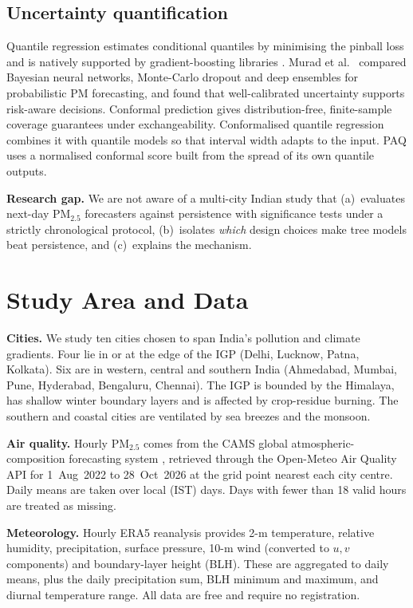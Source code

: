 \documentclass[conference]{IEEEtran}
\begin{document}
\subsection{Uncertainty quantification}
Quantile regression \cite{koenker1978} estimates conditional quantiles by minimising
the pinball loss and is natively supported by gradient-boosting libraries
\cite{chen2016}. Murad et al.\ \cite{murad2021} compared Bayesian neural networks,
Monte-Carlo dropout and deep ensembles for probabilistic PM forecasting, and found that
well-calibrated uncertainty supports risk-aware decisions. Conformal prediction
\cite{lei2018} gives distribution-free, finite-sample coverage guarantees under
exchangeability. Conformalised quantile regression \cite{romano2019} combines it with
quantile models so that interval width adapts to the input. PAQ uses a normalised
conformal score built from the spread of its own quantile outputs.

\textbf{Research gap.} We are not aware of a multi-city Indian study that (a)~evaluates
next-day PM$_{2.5}$ forecasters against persistence with significance tests under a
strictly chronological protocol, (b)~isolates \emph{which} design choices make tree
models beat persistence, and (c)~explains the mechanism.

\section{Study Area and Data}\label{sec:data}
\textbf{Cities.} We study ten cities chosen to span India's pollution and climate
gradients. Four lie in or at the edge of the IGP (Delhi, Lucknow, Patna, Kolkata).
Six are in western, central and southern India (Ahmedabad, Mumbai, Pune, Hyderabad,
Bengaluru, Chennai). The IGP is bounded by the Himalaya, has shallow winter boundary layers
and is affected by crop-residue burning. The southern and coastal cities are ventilated by
sea breezes and the monsoon.

\textbf{Air quality.} Hourly PM$_{2.5}$ comes from the CAMS global
atmospheric-composition forecasting system \cite{inness2019}, retrieved through the
Open-Meteo Air Quality API \cite{openmeteo} for 1~Aug~2022 to 28~Oct~2026 at the grid
point nearest each city centre. Daily means are taken over local (IST) days. Days with
fewer than 18 valid hours are treated as missing.

\textbf{Meteorology.} Hourly ERA5 reanalysis \cite{hersbach2020} provides 2-m
temperature, relative humidity, precipitation, surface pressure, 10-m wind
(converted to $u,v$ components) and boundary-layer height (BLH). These are aggregated to daily
means, plus the daily precipitation sum, BLH minimum and maximum, and diurnal temperature range.
All data are free and require no registration.
\end{document}
